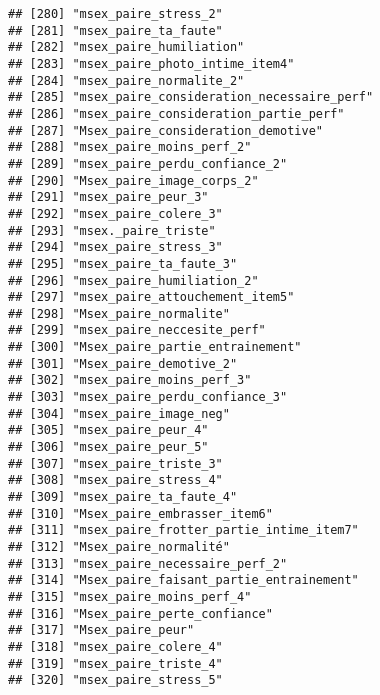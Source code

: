 \documentclass[
]{article}
\begin{document}
\begin{verbatim}
## [280] "msex_paire_stress_2"                                 
## [281] "msex_paire_ta_faute"                                 
## [282] "msex_paire_humiliation"                              
## [283] "msex_paire_photo_intime_item4"                       
## [284] "msex_paire_normalite_2"                              
## [285] "msex_paire_consideration_necessaire_perf"            
## [286] "msex_paire_consideration_partie_perf"                
## [287] "Msex_paire_consideration_demotive"                   
## [288] "msex_paire_moins_perf_2"                             
## [289] "msex_paire_perdu_confiance_2"                        
## [290] "Msex_paire_image_corps_2"                            
## [291] "msex_paire_peur_3"                                   
## [292] "msex_paire_colere_3"                                 
## [293] "msex._paire_triste"                                  
## [294] "msex_paire_stress_3"                                 
## [295] "msex_paire_ta_faute_3"                               
## [296] "msex_paire_humiliation_2"                            
## [297] "msex_paire_attouchement_item5"                       
## [298] "Msex_paire_normalite"                                
## [299] "msex_paire_neccesite_perf"                           
## [300] "Msex_paire_partie_entrainement"                      
## [301] "Msex_paire_demotive_2"                               
## [302] "msex_paire_moins_perf_3"                             
## [303] "msex_paire_perdu_confiance_3"                        
## [304] "msex_paire_image_neg"                                
## [305] "msex_paire_peur_4"                                   
## [306] "msex_paire_peur_5"                                   
## [307] "msex_paire_triste_3"                                 
## [308] "msex_paire_stress_4"                                 
## [309] "msex_paire_ta_faute_4"                               
## [310] "Msex_paire_embrasser_item6"                          
## [311] "msex_paire_frotter_partie_intime_item7"              
## [312] "Msex_paire_normalité"                                
## [313] "msex_paire_necessaire_perf_2"                        
## [314] "Msex_paire_faisant_partie_entrainement"              
## [315] "msex_paire_moins_perf_4"                             
## [316] "Msex_paire_perte_confiance"                          
## [317] "Msex_paire_peur"                                     
## [318] "msex_paire_colere_4"                                 
## [319] "msex_paire_triste_4"                                 
## [320] "msex_paire_stress_5"                                 

\end{verbatim}
\end{document}
